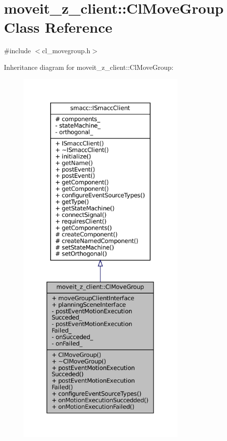 \hypertarget{classmoveit__z__client_1_1ClMoveGroup}{}\section{moveit\+\_\+z\+\_\+client\+:\+:Cl\+Move\+Group Class Reference}
\label{classmoveit__z__client_1_1ClMoveGroup}


{\ttfamily \#include $<$cl\+\_\+movegroup.\+h$>$}



Inheritance diagram for moveit\+\_\+z\+\_\+client\+:\+:Cl\+Move\+Group\+:
\nopagebreak
\begin{figure}[H]
\begin{center}
\leavevmode
\includegraphics[height=550pt]{classmoveit__z__client_1_1ClMoveGroup__inherit__graph}
\end{center}
\end{figure}


